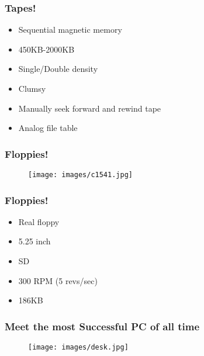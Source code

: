 \documentclass[aspectratio=43]{uva-inf-presentation}
\begin{document}
\begin{frame}
\frametitle{Tapes!}

\begin{itemize}
\item Sequential magnetic memory
\item 450KB-2000KB
\item Single/Double density
\item Clumsy
\item Manually seek forward and rewind tape
\item Analog file table
\end{itemize}

\end{frame}


\begin{frame}
\frametitle{Floppies!}

\begin{figure}
\texttt{[image: images/c1541.jpg]}
\end{figure}

\end{frame}


\begin{frame}
\frametitle{Floppies!}

\begin{itemize}
\item Real floppy
\item 5.25 inch
\item SD
\item 300 RPM (5 revs/sec)
\item 186KB
\end{itemize}

\end{frame}


\begin{frame}
\frametitle{Meet the most Successful PC of all time}

\begin{figure}
\texttt{[image: images/desk.jpg]}
\end{figure}

\end{frame}

\end{document}
